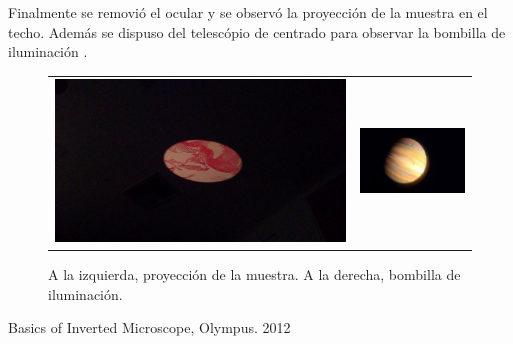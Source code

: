 \documentclass[addpoints,10pt]{exam}
\begin{document}
	Finalmente se removi\'o el ocular y se observ\'o la proyecci\'on de la muestra en el techo. Adem\'as se dispuso del telesc\'opio de centrado para observar la bombilla de iluminaci\'on \cite{Olympus}.
	
	\begin{figure}[h]
		\centering
		\begin{tabular}{cc}
			\includegraphics[width = 0.4\linewidth]{proyeccion.jpg} & 
			\includegraphics[width = 0.35\linewidth]{bombilla.jpg}
		\end{tabular}
		\caption{A la izquierda, proyecci\'on de la muestra. A la derecha, bombilla de iluminaci\'on.}
	\end{figure}


	\begin{thebibliography}{9}
		Basics of Inverted Microscope, Olympus. 2012 
	\end{thebibliography}	
\end{document}
